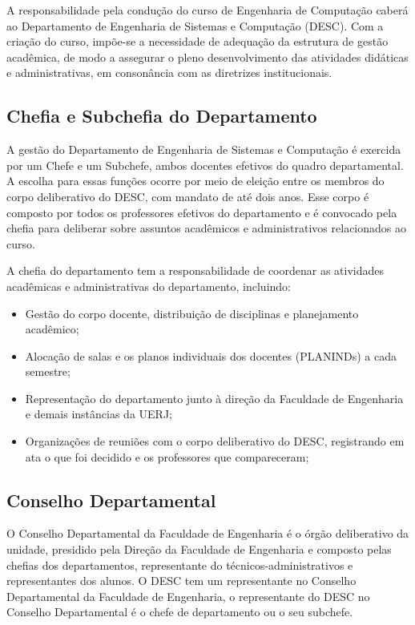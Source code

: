 A responsabilidade pela condução do curso de Engenharia de Computação caberá ao Departamento de Engenharia de Sistemas e Computação (DESC). Com a criação do curso, impõe-se a necessidade de adequação da estrutura de gestão acadêmica, de modo a assegurar o pleno desenvolvimento das atividades didáticas e administrativas, em consonância com as diretrizes institucionais.

\subsection{Chefia e Subchefia do Departamento}

A gestão do Departamento de Engenharia de Sistemas e Computação é exercida por um Chefe e um Subchefe, ambos docentes efetivos do quadro departamental. A escolha para essas funções ocorre por meio de eleição entre os membros do corpo deliberativo do DESC, com mandato de até dois anos. Esse corpo é composto por todos os professores efetivos do departamento e é convocado pela chefia para deliberar sobre assuntos acadêmicos e administrativos relacionados ao curso.

A chefia do departamento tem a responsabilidade de coordenar as atividades acadêmicas e administrativas do departamento, incluindo:

\begin{itemize}
    \item Gestão do corpo docente, distribuição de disciplinas e planejamento acadêmico;
    \item Alocação de salas e os planos individuais dos docentes (PLANINDs) a cada semestre;
    \item Representação do departamento junto à direção da Faculdade de Engenharia e demais instâncias da UERJ;
    \item Organizações de reuniões com o corpo deliberativo do DESC, registrando em ata o que foi decidido e os professores que compareceram;
\end{itemize}

\subsection{Conselho Departamental}

O Conselho Departamental da Faculdade de Engenharia é o órgão deliberativo da unidade, presidido pela Direção da Faculdade de Engenharia e composto pelas chefias dos departamentos, representante do técnicos-administrativos e representantes dos alunos. O DESC tem um representante no Conselho Departamental da Faculdade de Engenharia, o representante do DESC no Conselho Departamental é o chefe de departamento ou o seu subchefe.


